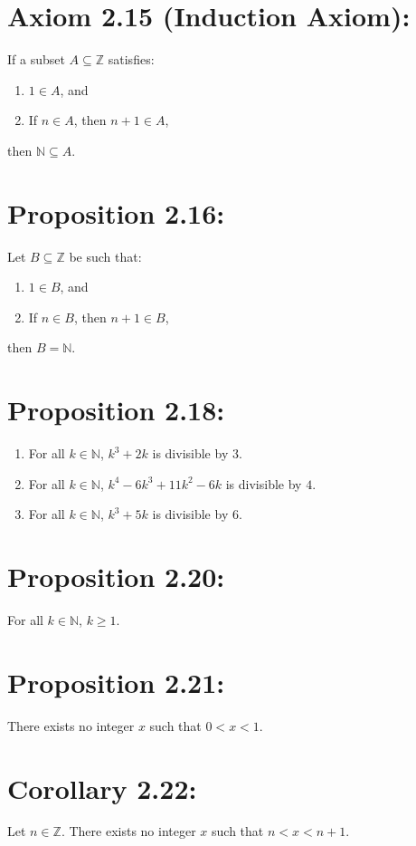 \section*{Axiom 2.15 (Induction Axiom):}
If a subset $A \subseteq \mathbb{Z}$ satisfies:
\begin{enumerate}
    \item $1 \in A$, and
    \item If $n \in A$, then $n+1 \in A$,
\end{enumerate}
then $\mathbb{N} \subseteq A$.



\section*{Proposition 2.16:}
Let $B \subseteq \mathbb{Z}$ be such that:
\begin{enumerate}
    \item $1 \in B$, and
    \item If $n \in B$, then $n+1 \in B$,
\end{enumerate}
then $B = \mathbb{N}$.

\section*{Proposition 2.18:}
\begin{enumerate}[label=(\roman*)]
    \item For all $k \in \mathbb{N}$, $k^3+2k$ is divisible by $3$.
    \item For all $k \in \mathbb{N}$, $k^4-6k^3+11k^2-6k$ is divisible by $4$.
    \item For all $k \in \mathbb{N}$, $k^3+5k$ is divisible by $6$.
\end{enumerate}

\section*{Proposition 2.20:}
For all $k \in \mathbb{N}$, $k \geq 1$.

\section*{Proposition 2.21:}
There exists no integer $x$ such that $0 < x < 1$.

\section*{Corollary 2.22:}
Let $n \in \mathbb{Z}$. There exists no integer $x$ such that $n < x < n+1$.

